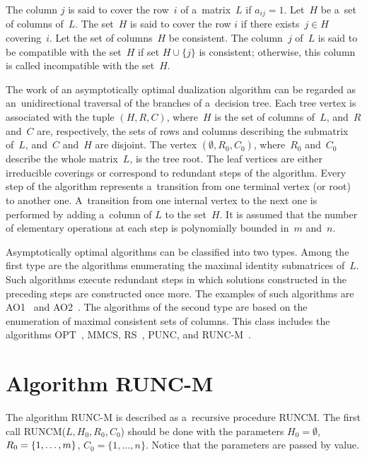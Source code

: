 \begin{multicols}{2}
The column  $j$ is said to cover the row~$i$ of a~matrix~$L$ if
$a_{ij} = 1$. Let~$H$ be a~set of columns of~$L$. The set~$H$
is said to cover the row $i$ if there exists~$j \in H$ covering~$i$. 
Let the set of columns~$H$ be consistent. The column~$j$ 
of~$L$ is said to be {compatible} with the set~$H$ if set
$H\cup\{j\}$ is consistent;
otherwise, this column is called {incompatible} with the set~$H$.

The work of an asymptotically optimal dualization algorithm  can
be regarded as an~unidirectional traversal of the branches of 
a~decision tree. Each tree vertex is associated with the tuple
$(H,R,C)$, where~$H$ is the set of columns of~$L$, and~$R$ and~$C$
are, respectively, the sets of rows and columns describing the
submatrix of~$L$, and~$C$ and~$H$ are disjoint. The vertex
$(\emptyset, R_0, C_0)$, where~$R_0$ and~$C_0$ describe the whole
matrix~$L$, is the tree root. The leaf vertices are either
irreducible coverings or correspond to redundant steps of the
algorithm. Every step of the algorithm represents a~transition
from one terminal vertex (or root) to another one. A~transition
from one internal vertex to the next one is performed by adding 
a~column of $L$ to the set~$H$. It is assumed that the number of
elementary operations at each step is polynomially bounded in~$m$
and~$n$.
{

}

Asymptotically optimal algorithms can be classified into two
types. Among the first type are the algorithms enumerating the
maximal identity submatrices of~$L$. Such algorithms execute
redundant steps in which solutions constructed in the preceding
steps are constructed once more. The examples of such algorithms are
AO1~\cite{D1977} and AO2~\cite{D2004}. The algorithms of the
second type  are based on the enumeration of maximal consistent
sets of columns. This class includes the algorithms OPT~\cite{DI2008}, MMCS, 
RS~\cite{MU2011, MU2014}, PUNC, and RUNC-M~\cite{DP2015}.
{

}


\section{Algorithm RUNC-M}

\noindent
The algorithm RUNC-M is described as a~recursive procedure
RUNCM. 
The first call RUNCM($L,H_0,R_0,C_0$) should be done with the parameters 
$H_0=\emptyset$,
$R_0\linebreak =\{1,\ldots,m\}$, 
$C_0=\{1,\ldots,n\}$. Notice that the parameters are passed by value.



\end{multicols}
